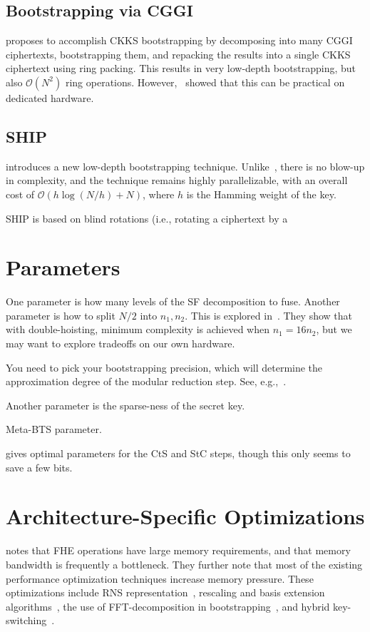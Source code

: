 \documentclass[../fheimpl.tex]{subfiles}
\begin{document}
    \subsection{Bootstrapping via CGGI}
    \cite{cryptoeprint:2021/691} proposes to accomplish CKKS bootstrapping by decomposing into many CGGI ciphertexts, bootstrapping them, and repacking the results into a single CKKS ciphertext using ring packing. This results in very low-depth bootstrapping, but also $\mathcal{O}(N^2)$ ring operations. However,~\cite{10609598} showed that this can be practical on dedicated hardware.

    \subsection{SHIP}
    \cite{cryptoeprint:2025/784} introduces a new low-depth bootstrapping technique. Unlike~\cite{cryptoeprint:2021/691}, there is no blow-up in complexity, and the technique remains highly parallelizable, with an overall cost of $\mathcal{O}(h\log(N/h)+N)$, where $h$ is the Hamming weight of the key.

    SHIP is based on blind rotations (i.e., rotating a ciphertext by a
    
    \section{Parameters}
    One parameter is how many levels of the \textsf{SF} decomposition to fuse. Another parameter is how to split $N/2$ into $n_1, n_2$. This is explored in~\cite{cryptoeprint:2020/1203}. They show that with double-hoisting, minimum complexity is achieved when $n_1=16n_2$, but we may want to explore tradeoffs on our own hardware.
    
    You need to pick your bootstrapping precision, which will determine the approximation degree of the modular reduction step. See, e.g.,~\cite{cryptoeprint:2021/572}.
    
    Another parameter is the sparse-ness of the secret key.
    
    Meta-BTS parameter.

    \cite{cryptoeprint:2024/1379} gives optimal parameters for the CtS and StC steps, though this only seems to save a few bits.
    
    \section{Architecture-Specific Optimizations}
    \cite{cryptoeprint:2021/508} notes that FHE operations have large memory requirements, and that memory bandwidth is frequently a bottleneck. They further note that most of the existing performance optimization techniques increase memory pressure. These optimizations include RNS representation~\cite{cryptoeprint:2016/510, cryptoeprint:2018/931}, rescaling and basis extension algorithms~\cite{cryptoeprint:2018/931}, the use of FFT-decomposition in bootstrapping~\cite{cryptoeprint:2018/1043,cryptoeprint:2018/1073}, and hybrid key-switching~\cite{cryptoeprint:2019/688}.
    
\end{document}
